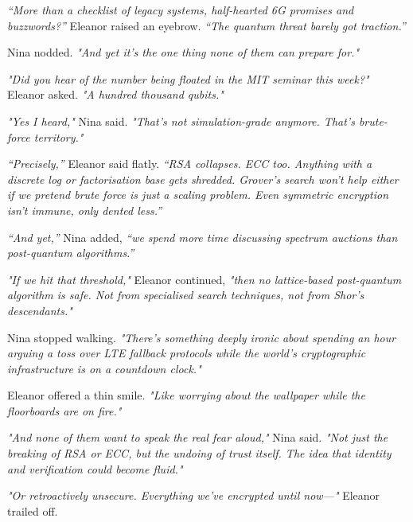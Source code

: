 \textit{``More than a checklist of legacy systems, half-hearted 6G promises and buzzwords?''} Eleanor raised an eyebrow. \textit{``The quantum threat barely got traction.''}

\smallskip

Nina nodded. \textit{"And yet it's the one thing none of them can prepare for."}

\textit{"Did you hear of the number being floated in the MIT seminar this week?"} Eleanor asked. \textit{"A hundred thousand qubits."}

\smallskip

\textit{"Yes I heard,"} Nina said. \textit{"That’s not simulation-grade anymore. That’s brute-force territory."}


\textit{``Precisely,''} Eleanor said flatly. \textit{``RSA collapses. ECC too. Anything with a discrete log or factorisation base gets shredded. Grover’s search won’t help either if we pretend brute force is just a scaling problem. Even symmetric encryption isn’t immune, only dented less.''}

\smallskip

\textit{``And yet,''} Nina added, \textit{``we spend more time discussing spectrum auctions than post-quantum algorithms.''}

\smallskip

\textit{"If we hit that threshold,"} Eleanor continued, \textit{"then no lattice-based post-quantum algorithm is safe. Not from specialised search techniques, not from Shor’s descendants."}

Nina stopped walking. \textit{"There’s something deeply ironic about spending an hour arguing a toss over LTE fallback protocols while the world's cryptographic infrastructure is on a countdown clock."}

\smallskip

Eleanor offered a thin smile. \textit{"Like worrying about the wallpaper while the floorboards are on fire."}

\smallskip

\textit{"And none of them want to speak the real fear aloud,"} Nina said. \textit{"Not just the breaking of RSA or ECC, but the undoing of trust itself. The idea that identity and verification could become fluid."}

\textit{"Or retroactively unsecure. Everything we’ve encrypted until now---"} Eleanor trailed off.

